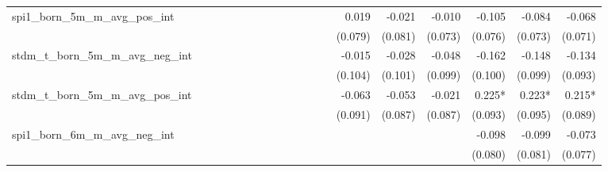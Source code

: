 \begin{tabular}{lrrrrrrrrrrrrrrrrrr}
spi1\_born\_5m\_m\_avg\_pos\_int            &             &             &             &             &             &             &             &             &             &             &             &             &       0.019 &      -0.021 &      -0.010 &      -0.105 &      -0.084 &      -0.068 \\ 
                                            &             &             &             &             &             &             &             &             &             &             &             &             &     (0.079) &     (0.081) &     (0.073) &     (0.076) &     (0.073) &     (0.071) \\ 
stdm\_t\_born\_5m\_m\_avg\_neg\_int         &             &             &             &             &             &             &             &             &             &             &             &             &      -0.015 &      -0.028 &      -0.048 &      -0.162 &      -0.148 &      -0.134 \\ 
                                            &             &             &             &             &             &             &             &             &             &             &             &             &     (0.104) &     (0.101) &     (0.099) &     (0.100) &     (0.099) &     (0.093) \\ 
stdm\_t\_born\_5m\_m\_avg\_pos\_int         &             &             &             &             &             &             &             &             &             &             &             &             &      -0.063 &      -0.053 &      -0.021 &      0.225* &      0.223* &      0.215* \\ 
                                            &             &             &             &             &             &             &             &             &             &             &             &             &     (0.091) &     (0.087) &     (0.087) &     (0.093) &     (0.095) &     (0.089) \\ 
spi1\_born\_6m\_m\_avg\_neg\_int            &             &             &             &             &             &             &             &             &             &             &             &             &             &             &             &      -0.098 &      -0.099 &      -0.073 \\ 
                                            &             &             &             &             &             &             &             &             &             &             &             &             &             &             &             &     (0.080) &     (0.081) &     (0.077) \\ 

\end{tabular}
